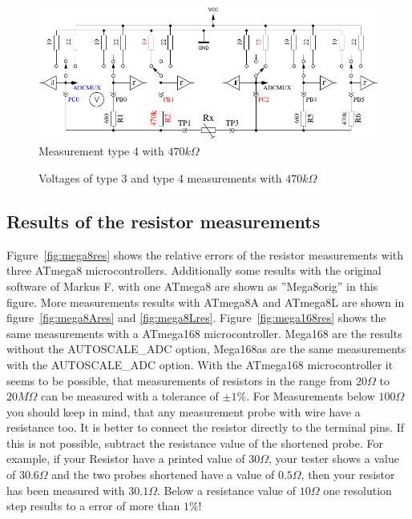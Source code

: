 \begin{figure}[H]
 \centering
 \includegraphics[]{../FIG/ResistormessH2.pdf}
 \caption{Measurement type 4 with \(470k\Omega\) }
\label{fig:RH2mes}
\end{figure}

\begin{figure}[H]
\centering

\caption{Voltages of type 3 and type 4 measurements with \(470k\Omega\) }
\label{fig:RHv}
\end{figure}

\subsection{Results of the resistor measurements}
Figure~\ref{fig:mega8res} shows the relative errors of the resistor measurements with three
ATmega8 microcontrollers. Additionally some results with the original software of Markus F.
with one ATmega8 are shown as ''Mega8orig'' in this figure.
More measurements results with ATmega8A and ATmega8L are shown in  figure~\ref{fig:mega8Ares} 
and \ref{fig:mega8Lres}.
Figure~\ref{fig:mega168res} shows the same measurements with a ATmega168 microcontroller.
Mega168 are the results without the AUTOSCALE\_ADC option, Mega168as are the same
measurements with the AUTOSCALE\_ADC option.
With the ATmega168 microcontroller it seems to be possible, that measurements of resistors
in the range from \(20\Omega\) to \(20M\Omega\) can be measured with a tolerance of \(\pm1\%\).
For Measurements below \(100\Omega\) you should keep in mind, that any measurement probe with
wire have a resistance too. It is better to connect the resistor directly to the terminal pins.
If this is not possible, subtract the resistance value of the shortened probe.
For example, if your Resistor have a printed value of \(30\Omega\), your tester shows a value of \(30.6\Omega\)
and the two probes shortened have a value of \(0.5\Omega\), then your resistor has been measured
with \(30.1\Omega\).
Below a resistance value of \(10\Omega\) one resolution step results to a error of more than \(1\%\)!

